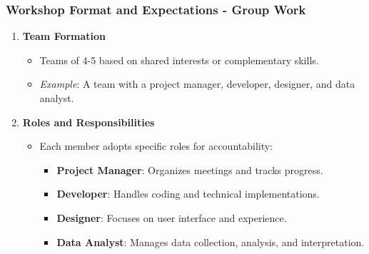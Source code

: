 \documentclass[aspectratio=169]{beamer}
\begin{document}
\begin{frame}[fragile]
    \frametitle{Workshop Format and Expectations - Group Work}
    \begin{enumerate}
        \item \textbf{Team Formation}
            \begin{itemize}
                \item Teams of 4-5 based on shared interests or complementary skills.
                \item \textit{Example}: A team with a project manager, developer, designer, and data analyst.
            \end{itemize}
        \item \textbf{Roles and Responsibilities}
            \begin{itemize}
                \item Each member adopts specific roles for accountability:
                    \begin{itemize}
                        \item \textbf{Project Manager}: Organizes meetings and tracks progress.
                        \item \textbf{Developer}: Handles coding and technical implementations.
                        \item \textbf{Designer}: Focuses on user interface and experience.
                        \item \textbf{Data Analyst}: Manages data collection, analysis, and interpretation.
                    \end{itemize}
            \end{itemize}
    \end{enumerate}
\end{frame}
\end{document}
